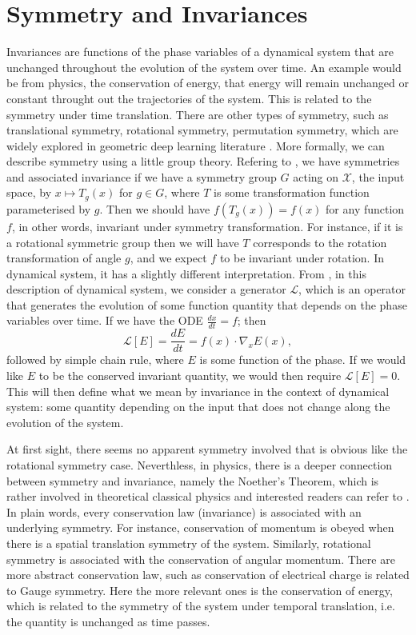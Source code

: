 \documentclass{statsmsc}
\begin{document}
\section{Symmetry and Invariances}
Invariances are functions of the phase variables of a dynamical system that are unchanged throughout the evolution of the system over time. 
An example would be from physics, the conservation of energy, that energy will remain unchanged or constant throught out the trajectories of the system.
This is related to the symmetry under time translation.
There are other types of symmetry, such as translational symmetry, rotational symmetry, permutation symmetry, which are widely explored in geometric deep learning literature \cite{Bronstein2017}. 
More formally, we can describe symmetry using a little group theory.
Refering to \cite{Kondor2008}, we have symmetries and associated invariance if we have a symmetry group $G$ acting on $\mathcal{X}$, the input space, by $x\mapsto T_g(x)$ for $g\in G$, where $T$ is some transformation function parameterised by $g$. 
Then we should have $f(T_g(x))=f(x)$ for any function $f$, in other words, invariant under symmetry transformation.
For instance, if it is a rotational symmetric group then we will have $T$ corresponds to the rotation transformation of angle $g$, and we expect $f$ to be invariant under rotation.
In dynamical system, it has a slightly different interpretation.
From \cite{marsden_sirovich_antman_2008}, in this description of dynamical system, we consider a generator $\mathcal{L}$, which is an operator that generates the evolution of some function quantity that depends on the phase variables over time.
If we have the ODE $\frac{dx}{dt}=f$; then \begin{equation}\mathcal{L}[E]=\frac{dE}{dt}=f(x)\cdot \nabla_x E(x),\label{equ:LE}\end{equation} followed by simple chain rule, where $E$ is some function of the phase.
If we would like $E$ to be the conserved invariant quantity, we would then require $\mathcal{L}[E]=0$. 
This will then define what we mean by invariance in the context of dynamical system: some quantity depending on the input that does not change along the evolution of the system.

At first sight, there seems no apparent symmetry involved that is obvious like the rotational symmetry case. 
Neverthless, in physics, there is a deeper connection between symmetry and invariance, namely the Noether's Theorem, which is rather involved in theoretical classical physics and interested readers can refer to \cite{lemos_2018}.
In plain words, every conservation law (invariance) is associated with an underlying symmetry.
For instance, conservation of momentum is obeyed when there is a spatial translation symmetry of the system. 
Similarly, rotational symmetry is associated with the conservation of angular momentum.
There are more abstract conservation law, such as conservation of electrical charge is related to Gauge symmetry.
Here the more relevant ones is the conservation of energy, which is related to the symmetry of the system under temporal translation, i.e. the quantity is unchanged as time passes.
\end{document}
